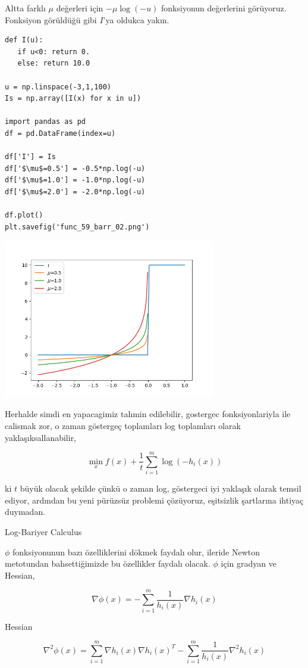 \documentclass[12pt,fleqn]{article}\usepackage{../../common}
\begin{document}
Altta farklı $\mu$ değerleri için
$-\mu \log(-u)$ fonksiyonun değerlerini görüyoruz. Fonksiyon görüldüğü gibi
$I$'ya oldukca yakın.

\begin{verbatim}
def I(u): 
   if u<0: return 0.
   else: return 10.0

u = np.linspace(-3,1,100)
Is = np.array([I(x) for x in u])

import pandas as pd
df = pd.DataFrame(index=u)

df['I'] = Is
df['$\mu$=0.5'] = -0.5*np.log(-u)
df['$\mu$=1.0'] = -1.0*np.log(-u)
df['$\mu$=2.0'] = -2.0*np.log(-u)

df.plot()
plt.savefig('func_59_barr_02.png')
\end{verbatim}

\includegraphics[width=25em]{func_59_barr_02.png}

Herhalde simdi en yapacagimiz tahmin edilebilir, gostergec fonksiyonlariyla
ile calismak zor, o zaman göstergeç toplamları log toplamları olarak
yaklaşıksallanabilir,

$$
\min_x f(x) + \frac{1}{t} \sum_{i=1}^{m} \log(-h_i(x))
$$

ki $t$ büyük olacak şekilde çünkü o zaman log, göstergeci iyi yaklaşık
olarak temsil ediyor, ardından bu yeni pürüzsüz problemi çözüyoruz,
eşitsizlik şartlarına ihtiyaç duymadan. 

Log-Bariyer Calculus

$\phi$ fonksiyonunun bazı özelliklerini dökmek faydalı olur, ileride Newton
metotundan bahsettiğimizde bu özellikler faydalı olacak. $\phi$ için gradyan ve
Hessian,

$$
\nabla \phi(x) = - \sum_{i=1}^{m} \frac{1}{h_i(x)} \nabla h_i(x)
$$

Hessian

$$
\nabla^2 \phi(x) = 
\sum_{i=1}^{m} \nabla h_i(x) \nabla h_i(x)^T - 
\sum_{i=1}^{m} \frac{1}{h_i(x)} \nabla^2 h_i(x)
$$
\end{document}
